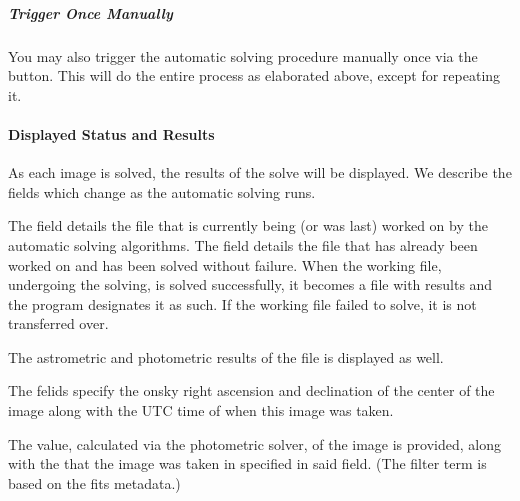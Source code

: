 \documentclass[letterpaper,11pt,english]{sphinxmanual}
\begin{document}
\subparagraph{Trigger Once Manually}
\label{\detokenize{user/automatic_mode:trigger-once-manually}}
\sphinxAtStartPar
You may also trigger the automatic solving procedure manually once via the
 button. This will do the entire process as elaborated above,
except for repeating it.


\paragraph{Displayed Status and Results}
\label{\detokenize{user/automatic_mode:displayed-status-and-results}}
\sphinxAtStartPar
As each image is solved, the results of the solve will be displayed. We
describe the fields which change as the automatic solving runs.

\sphinxAtStartPar
The  field details the file that is currently being (or
was last) worked on by the automatic solving algorithms. The
 field details the file that has already been worked on
and has been solved without failure. When the working file, undergoing the
solving, is solved successfully, it becomes a file with results and the
program designates it as such. If the working file failed to solve, it is not
transferred over.

\sphinxAtStartPar
The astrometric and photometric results of the  file is
displayed as well.

\sphinxAtStartPar
The  felids specify the on\sphinxhyphen{}sky right ascension and
declination of the center of the image along with the UTC time of when this
image was taken.

\sphinxAtStartPar
The  value, calculated via the photometric solver, of
the image is provided, along with the  that the image was
taken in specified in said field. (The filter term is based on the fits
metadata.)
\end{document}
